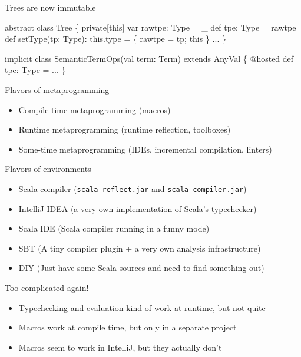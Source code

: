\documentclass[svgnames,dvipsnames,hyperref={bookmarks=false},usepdftitle=false]{beamer}
\begin{document}
\begin{frame}[fragile]{Trees are now immutable}
\begin{beforeblock}
abstract class Tree \{
  private[this] var rawtpe: Type = \_
  def tpe: Type = rawtpe
  def setType(tp: Type): this.type = \{ rawtpe = tp; this \}
  ...
\}
\end{beforeblock}
\pause
\begin{afterblock}
implicit class SemanticTermOps(val term: Term) extends AnyVal \{
  @hosted def tpe: Type = ...
\}
\end{afterblock}
\end{frame}


\begin{frame}{Flavors of metaprogramming}
\begin{itemize}
\item Compile-time metaprogramming (macros)
\item Runtime metaprogramming (runtime reflection, toolboxes)
\item Some-time metaprogramming (IDEs, incremental compilation, linters)
\end{itemize}
\end{frame}

\begin{frame}{Flavors of environments}
\begin{itemize}
\item Scala compiler (\texttt{scala-reflect.jar} and \texttt{scala-compiler.jar})
\item IntelliJ IDEA (a very own implementation of Scala's typechecker)
\item Scala IDE (Scala compiler running in a funny mode)
\item SBT (A tiny compiler plugin + a very own analysis infrastructure)
\item DIY (Just have some Scala sources and need to find something out)
\end{itemize}
\end{frame}

\begin{frame}{Too complicated again!}
\begin{itemize}
\item Typechecking and evaluation kind of work at runtime, but not quite
\item Macros work at compile time, but only in a separate project
\item Macros seem to work in IntelliJ, but they actually don't
\end{itemize}
\end{frame}
\end{document}
